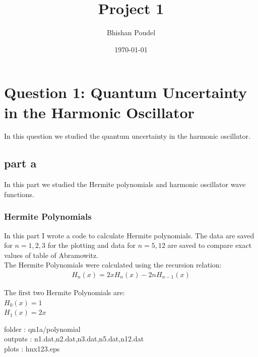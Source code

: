 \documentclass[11pt,a4paper,english]{article}
\title{Project 1}
\author{Bhishan Poudel}
\date{\today}
\newcommand{\beqa}{\begin{eqnarray}}
\newcommand{\eeqa}{\end{eqnarray}}
\begin{document}
\maketitle
\tableofcontents
\listoffigures
\clearpage


\section{Question 1: Quantum Uncertainty in the Harmonic Oscillator}
In this question we studied the quantum uncertainty in the harmonic oscillator.\\

	
	\subsection{part a}
	
	In this part we studied the Hermite polynomials and harmonic oscillator wave functions.
	
	\subsubsection{Hermite Polynomials}
	
In this part I wrote a code to calculate Hermite polynomials. The data are saved for $n=1,2,3 $ for the plotting and data for $n=5,12$ are saved to compare exact values of table of Abramowitz.\\
The Hermite Polynomials were calculated using the recursion relation:\\

\beqa
H_{n}(x)=2xH_{n}(x)-2nH_{n-1}(x)
\eeqa

The first two Hermite Polynomials are:\\
$H_{0}(x)=1$\\
$H_{1}(x)=2x$

    folder       : qn1a/polynomial\\
	outputs      : n1.dat,n2.dat,n3.dat,n5.dat,n12.dat\\
	plots        : hnx123.eps\\
	
\end{document}
